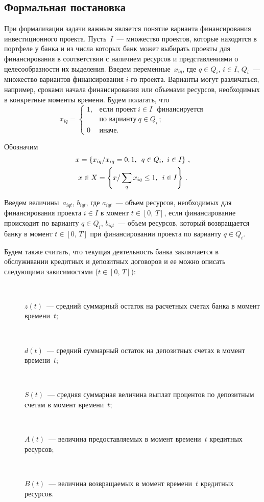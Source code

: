 \begin{multicols}{2}
\subsection{Формальная постановка} %
     
     При формализации задачи важным является понятие варианта 
финансирования инвестиционного проекта. Пусть~$I$~--- множество 
проектов, которые находятся в портфеле у банка и из числа которых банк 
может выбирать проекты для финансирования в соответствии с наличием 
ресурсов и представлениями о целесообразности их выделения. Введем 
переменные~$x_{iq}$, где $q\in Q_i$, $i\in I$, $Q_i$~--- множество вариантов 
финансирования $i$-го  проекта. Варианты могут различаться, например, 
сроками начала финансирования или объемами ресурсов, необходимых в 
конкретные моменты времени. Будем полагать, что
     $$
     x_{iq}= 
     \begin{cases}
     1, & \mbox{если проект}\ i\in I \mbox{~~финансируется}\\
     & \mbox{по варианту}\ q\in  Q_i\,;\\
     0 & \mbox{иначе.}
     \end{cases}
     $$
     

Обозначим
\begin{gather*}
x=\left \{ x_{iq}/x_{iq} =0, 1, \enskip q\in Q_i, \ i\in I\right \}\,,\\
x\in X=\left \{ x/ \sum\limits_q x_{iq}\leq 1, \enskip i\in I\right \}\,.
\end{gather*}

     
     Введем величины~$a_{iqt}$, $b_{iqt}$, где $a_{iqt}$~--- объем 
ресурсов, необходимых для финансирования проекта $i\in I$ в момент $t\in 
[0,\,T]$, если финансирование происходит по варианту $q\in Q_i$, 
$b_{iqt}$~--- объем ресурсов, который возвращается банку в момент $t\in 
[0,\,T]$ при финансировании проекта по варианту $q\in Q_i$.

Будем также считать, что текущая деятельность банка заключается в 
обслуживании кредитных и депозитных договоров и ее можно описать 
сле\-ду\-ющи\-ми зависимостями ($t\in [0,\,T]$):
\begin{description}
\item[\,] $z(t)$~--- средний суммарный остаток на расчетных счетах банка в момент 
времени~$t$; 
\item[\,]
$d(t)$~--- средний суммарный остаток на депозитных счетах в момент 
времени~$t$;
\item[\,]
$S(t)$~--- средняя суммарная величина выплат процентов по депозитным 
счетам в момент времени~$t$; 
\item[\,]
$A(t)$~--- величина предоставляемых в момент времени~$t$ кредитных 
ресурсов;
\item[\,]
$B(t)$~--- величина возвращаемых в момент времени~$t$ кредитных 
ресурсов.
\end{description}
     

\end{multicols}
